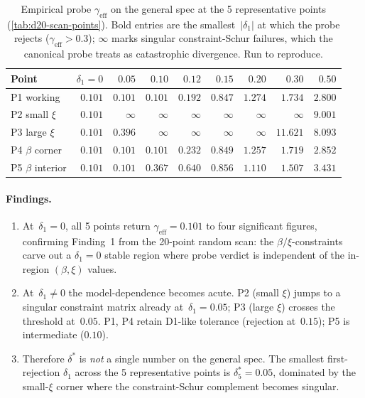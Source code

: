 \begin{table}[h]
\centering
\begin{tabular}{lrrrrrrrr}
\toprule
\textbf{Point} & $\delta_1=0$ & $0.05$ & $0.10$ & $0.12$ & $0.15$ & $0.20$ & $0.30$ & $0.50$ \\
\midrule
P1 working    & $0.101$ & $0.101$ & $0.101$ & $0.192$ & $\mathbf{0.847}$ & $1.274$ & $1.734$ & $2.800$ \\
P2 small $\xi$ & $0.101$ & $\mathbf{\infty}$ & $\infty$ & $\infty$ & $\infty$ & $\infty$ & $\infty$ & $9.001$ \\
P3 large $\xi$ & $0.101$ & $\mathbf{0.396}$ & $\infty$ & $\infty$ & $\infty$ & $\infty$ & $11.621$ & $8.093$ \\
P4 $\beta$ corner & $0.101$ & $0.101$ & $0.101$ & $0.232$ & $\mathbf{0.849}$ & $1.257$ & $1.719$ & $2.852$ \\
P5 $\beta$ interior & $0.101$ & $0.101$ & $\mathbf{0.367}$ & $0.640$ & $0.856$ & $1.110$ & $1.507$ & $3.431$ \\
\bottomrule
\end{tabular}
\caption{Empirical probe $\gamma_\mathrm{eff}$ on the general spec at the
5 representative points (\cref{tab:d20-scan-points}).  Bold entries are
the smallest~$|\delta_1|$ at which the probe rejects ($\gamma_\mathrm{eff}>0.3$);
$\infty$ marks singular constraint-Schur failures, which the canonical probe
treats as catastrophic divergence.  Run 
to reproduce.}
\label{tab:d20-delta1-scan}
\end{table}

\paragraph{Findings.}
\begin{enumerate}
  \item At~$\delta_1=0$, all 5 points return $\gamma_\mathrm{eff}=0.101$ to
    four significant figures, confirming Finding~1 from the 20-point random
    scan: the $\beta/\xi$-constraints carve out a $\delta_1=0$ stable region
    where probe verdict is independent of the in-region $(\beta,\xi)$ values.
  \item At~$\delta_1\ne 0$ the model-dependence becomes acute.  P2 (small
    $\xi$) jumps to a singular constraint matrix already at~$\delta_1=0.05$;
    P3 (large $\xi$) crosses the threshold at~$0.05$.  P1, P4 retain D1-like
    tolerance (rejection at~$0.15$); P5 is intermediate ($0.10$).
  \item Therefore $\delta^*$ is \emph{not} a single number on the general
    spec.  The smallest first-rejection $\delta_1$ across the 5 representative
    points is $\delta^*_5 = 0.05$, dominated by the small-$\xi$ corner where
    the constraint-Schur complement becomes singular.
\end{enumerate}

